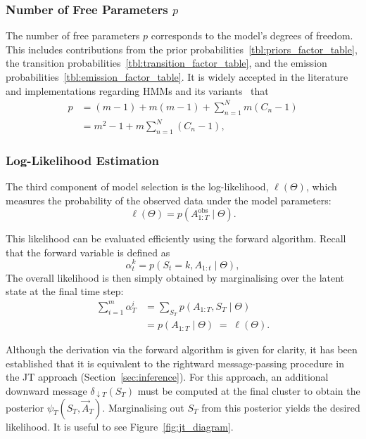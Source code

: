 \subsubsection{Number of Free Parameters $p$}

The number of free parameters $p$ corresponds to the model’s degrees of freedom. This includes contributions from the prior probabilities~\ref{tbl:priors_factor_table}, the transition probabilities~\ref{tbl:transition_factor_table}, and the emission probabilities~\ref{tbl:emission_factor_table}. It is widely accepted in the literature and implementations regarding HMMs and its variants~\cite{cran_hmmSeq,free_params_slides} that
\begin{align*}
    p &= (m-1) + m(m-1) + \sum_{n=1}^N m(C_n - 1) \\
      &= m^2 - 1 + m \sum_{n=1}^N (C_n - 1),
\end{align*}

\subsubsection{Log-Likelihood Estimation}

The third component of model selection is the log-likelihood, $\ell(\Theta)$, which measures the probability of the observed data under the model parameters:
\[
    \ell(\Theta) = p(A_{1:T}^\text{obs} \mid \Theta).
\]

This likelihood can be evaluated efficiently using the forward algorithm. Recall that the forward variable is defined as
\[
    \alpha_t^k = p(S_t = k, A_{1:t} \mid \Theta),
\]
The overall likelihood is then simply obtained by marginalising over the latent state at the final time step:
\begin{align*}
    \sum_{i=1}^m \alpha_T^i &= \sum_{S_T} p(A_{1:T}, S_T \mid \Theta) \\
                             &= p(A_{1:T} \mid \Theta) \;=\; \ell(\Theta).
\end{align*}

Although the derivation via the forward algorithm is given for clarity, it has been established that it is equivalent to the rightward message-passing procedure in the JT approach (Section~\ref{sec:inference}). For this approach, an additional downward message $\delta_{\downarrow T}(S_T)$ must be computed at the final cluster to obtain the posterior $\psi_T(S_T, \vec{A}_T)$. Marginalising out $S_T$ from this posterior yields the desired likelihood. It is useful to see Figure~\ref{fig:jt_diagram}.

